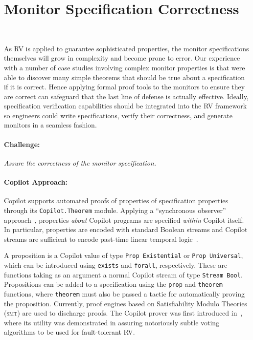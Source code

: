 \section{Monitor Specification Correctness}~\label{sec:verispec}


As RV is applied to  guarantee sophisticated properties, the
monitor specifications themselves will grow in complexity and become
prone to error.  Our experience with a number of case studies
involving complex monitor properties is that were able to discover
many simple theorems that should be true about a specification if it
is correct. Hence applying formal proof tools to the monitors to
ensure they are correct can safeguard that the last line of
defense is actually effective. Ideally, specification verification
capabilities should be integrated into the RV framework so engineers
could write specifications, verify their correctness, and generate
monitors in a seamless fashion.

\paragraph{Challenge:}  \emph{Assure  the correctness of the monitor
specification.}   



\paragraph{Copilot Approach:}  
 Copilot supports automated proofs of properties of specification
 properties  through its {\tt Copilot.Theorem} module.  Applying a 
``synchronous observer'' approach~\cite{amast93}, properties \emph{about}
Copilot programs are specified \emph{within} Copilot itself. In particular,
properties are encoded with standard Boolean streams and Copilot streams are
sufficient to encode past-time linear temporal logic~\cite{ptltl}.

 A proposition is a Copilot value of type \texttt{Prop Existential}
 or \texttt{Prop Universal}, which can be introduced using \texttt{exists} and
\texttt{forall}, respectively. These are functions taking as an argument a
normal Copilot stream of type \lstinline{Stream Bool}. Propositions can be added
to a specification using the \texttt{prop} and \texttt{theorem} functions,
where \texttt{theorem} must also be passed a tactic for automatically proving
the proposition. Currently, proof engines  based on
Satisfiability Modulo Theories (\textsc{smt})   are used to discharge
proofs.  The Copilot prover was first introduced
in~\cite{pike-rv-15}, where its utility was demonstrated in assuring
notoriously subtle voting algorithms to be used for fault-tolerant RV.

